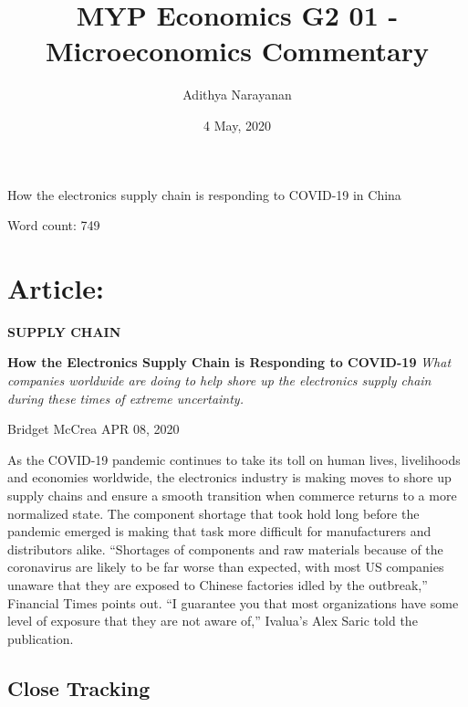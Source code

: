 \documentclass[11pt, a4paper]{article}
\title{MYP Economics G2 01 - Microeconomics Commentary}
\author{Adithya Narayanan}
\date{4 May, 2020}
\begin{document}
	\begin{titlepage}
		\maketitle

		\begin{center}
			\large How the electronics supply chain is responding to COVID-19 in China

			Word count: 749
		\end{center}
		\thispagestyle{empty}
	\end{titlepage}
	
	\newpage
	\tableofcontents
	\thispagestyle{empty}
	\newpage
	\clearpage
	\setcounter{page}{1}
	\setcounter{secnumdepth}{0}
	\section{Article:}
		\textbf{\footnotesize SUPPLY CHAIN}
		
		\bigbreak
		\noindent
		\textbf{\LARGE How the Electronics Supply Chain is Responding to COVID-19}
		\noindent
		\newline
		\textit{What companies worldwide are doing to help shore up the electronics supply chain during these times of extreme uncertainty.}
		
		\bigbreak
		\noindent
		Bridget McCrea
		\newline
		\noindent
		APR 08, 2020

		\bigbreak
		
		As the COVID-19 pandemic continues to take its toll on human lives, livelihoods and economies worldwide, the electronics industry is making moves to shore up supply chains and ensure a smooth transition when commerce returns to a more normalized state. The component shortage that took hold long before the pandemic emerged is making that task more difficult for manufacturers and distributors alike.
		\bigbreak
		“Shortages of components and raw materials because of the coronavirus are likely to be far worse than expected, with most US companies unaware that they are exposed to Chinese factories idled by the outbreak,” Financial Times points out. “I guarantee you that most organizations have some level of exposure that they are not aware of,” Ivalua’s Alex Saric told the publication.
		
		\subsection{Close Tracking}
\end{document}
